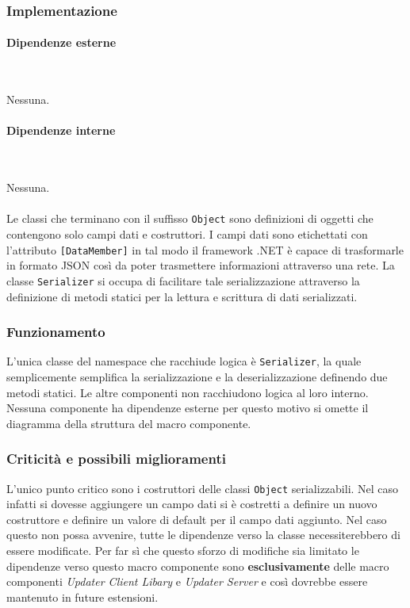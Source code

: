 \documentclass[../RelazioneFinale.tex]{subfiles}
\begin{document}
			\subsubsection{Implementazione}
			
				\paragraph{Dipendenze esterne} \ \par
					Nessuna.
				
				\paragraph{Dipendenze interne} \ \par
					Nessuna.
				
				\paragraph{}
				Le classi che terminano con il suffisso \verb|Object| sono definizioni di oggetti che contengono solo campi dati e costruttori. I campi dati sono etichettati con l'attributo \verb|[DataMember]| in tal modo il framework .NET è capace di trasformarle in formato JSON così da poter trasmettere informazioni attraverso una rete.
				La classe \verb|Serializer| si occupa di facilitare tale serializzazione attraverso la definizione di metodi statici per la lettura e scrittura di dati serializzati.
			
			\subsubsection{Funzionamento}
				L'unica classe del namespace che racchiude logica è \verb|Serializer|, la quale semplicemente semplifica la serializzazione e la deserializzazione definendo due metodi statici.
				Le altre componenti non racchiudono logica al loro interno.
				Nessuna componente ha dipendenze esterne per questo motivo si omette il diagramma della struttura del macro componente. 
			
			\subsubsection{Criticità e possibili miglioramenti}
				L'unico punto critico sono i costruttori delle classi \verb|Object| serializzabili. Nel caso infatti si dovesse aggiungere un campo dati si è costretti a definire un nuovo costruttore e definire un valore di default per il campo dati aggiunto. Nel caso questo non possa avvenire, tutte le dipendenze verso la classe necessiterebbero di essere modificate. Per far sì che questo sforzo di modifiche sia limitato le dipendenze verso questo macro componente sono \textbf{esclusivamente} delle macro componenti \emph{Updater Client Libary} e \emph{Updater Server} e così dovrebbe essere mantenuto in future estensioni.
		
\end{document}
